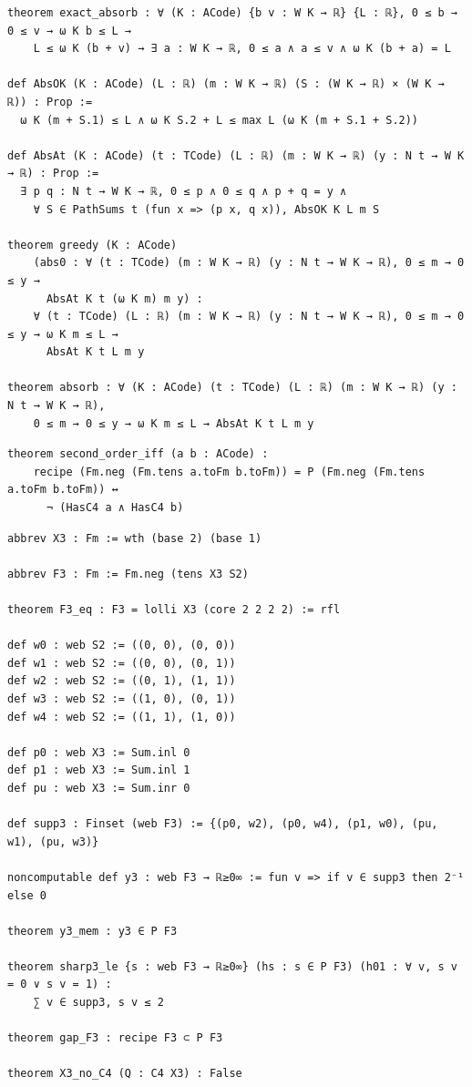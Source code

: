 \begin{lstlisting}
theorem exact_absorb : ∀ (K : ACode) {b v : W K → ℝ} {L : ℝ}, 0 ≤ b → 0 ≤ v → ω K b ≤ L →
    L ≤ ω K (b + v) → ∃ a : W K → ℝ, 0 ≤ a ∧ a ≤ v ∧ ω K (b + a) = L

def AbsOK (K : ACode) (L : ℝ) (m : W K → ℝ) (S : (W K → ℝ) × (W K → ℝ)) : Prop :=
  ω K (m + S.1) ≤ L ∧ ω K S.2 + L ≤ max L (ω K (m + S.1 + S.2))

def AbsAt (K : ACode) (t : TCode) (L : ℝ) (m : W K → ℝ) (y : N t → W K → ℝ) : Prop :=
  ∃ p q : N t → W K → ℝ, 0 ≤ p ∧ 0 ≤ q ∧ p + q = y ∧
    ∀ S ∈ PathSums t (fun x => (p x, q x)), AbsOK K L m S

theorem greedy (K : ACode)
    (abs0 : ∀ (t : TCode) (m : W K → ℝ) (y : N t → W K → ℝ), 0 ≤ m → 0 ≤ y →
      AbsAt K t (ω K m) m y) :
    ∀ (t : TCode) (L : ℝ) (m : W K → ℝ) (y : N t → W K → ℝ), 0 ≤ m → 0 ≤ y → ω K m ≤ L →
      AbsAt K t L m y

theorem absorb : ∀ (K : ACode) (t : TCode) (L : ℝ) (m : W K → ℝ) (y : N t → W K → ℝ),
    0 ≤ m → 0 ≤ y → ω K m ≤ L → AbsAt K t L m y
\end{lstlisting}

\begin{lstlisting}
theorem second_order_iff (a b : ACode) :
    recipe (Fm.neg (Fm.tens a.toFm b.toFm)) = P (Fm.neg (Fm.tens a.toFm b.toFm)) ↔
      ¬ (HasC4 a ∧ HasC4 b)
\end{lstlisting}

\begin{lstlisting}
abbrev X3 : Fm := wth (base 2) (base 1)

abbrev F3 : Fm := Fm.neg (tens X3 S2)

theorem F3_eq : F3 = lolli X3 (core 2 2 2 2) := rfl

def w0 : web S2 := ((0, 0), (0, 0))
def w1 : web S2 := ((0, 0), (0, 1))
def w2 : web S2 := ((0, 1), (1, 1))
def w3 : web S2 := ((1, 0), (0, 1))
def w4 : web S2 := ((1, 1), (1, 0))

def p0 : web X3 := Sum.inl 0
def p1 : web X3 := Sum.inl 1
def pu : web X3 := Sum.inr 0

def supp3 : Finset (web F3) := {(p0, w2), (p0, w4), (p1, w0), (pu, w1), (pu, w3)}

noncomputable def y3 : web F3 → ℝ≥0∞ := fun v => if v ∈ supp3 then 2⁻¹ else 0

theorem y3_mem : y3 ∈ P F3

theorem sharp3_le {s : web F3 → ℝ≥0∞} (hs : s ∈ P F3) (h01 : ∀ v, s v = 0 ∨ s v = 1) :
    ∑ v ∈ supp3, s v ≤ 2

theorem gap_F3 : recipe F3 ⊂ P F3

theorem X3_no_C4 (Q : C4 X3) : False
\end{lstlisting}

